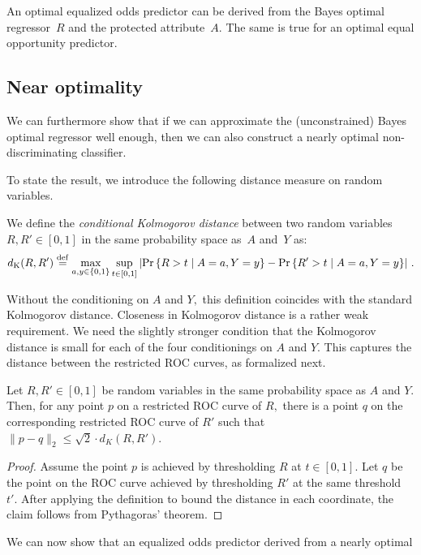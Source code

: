 \begin{corollary}
\label{cor:bayes-opt-fair}
An optimal equalized odds predictor can be derived from the Bayes
optimal regressor~$R$ and the protected attribute~$A.$ The same is true for
an optimal equal opportunity predictor.
\end{corollary}

\subsection{Near optimality}
%
We can furthermore show that if we can approximate the (unconstrained)
Bayes optimal regressor well enough, then we can also construct a
nearly optimal non-discriminating classifier.

To state the result, we introduce the following distance measure on random
variables.
\begin{definition}
We define the \emph{conditional Kolmogorov distance}
between two random variables $R,R'\in[0,1]$ in the same probability space
as~$A$ and~$Y$ as:
\begin{equation}
d_{\mathrm{K}}(R, R')\stackrel{\small \mathrm{def}}{=}
\max_{a,y\in\{0,1\}} \sup_{t\in[0,1]}
\left|\Pr\left\{R > t\mid A=a, Y=y\right\}
- \Pr\left\{R' > t\mid A=a, Y=y\right\}
\right|\,.
\end{equation}
\end{definition}
Without the conditioning on $A$ and $Y,$ this definition coincides with the
standard Kolmogorov distance. Closeness in Kolmogorov distance is a rather weak
requirement. We need the slightly stronger condition that the Kolmogorov
distance is small for each of the four conditionings on $A$ and $Y.$ This
captures the distance between the restricted ROC curves, as formalized next.
%
\begin{lemma}\label{lem:pythagoras}
Let $R, R'\in[0,1]$ be random variables in the same probability space as $A$ and
$Y.$ Then, for any point $p$ on a restricted ROC curve of $R,$ there is a point
$q$ on the corresponding restricted ROC curve of $R'$ such that
$\|p-q\|_2\le\sqrt{2}\cdot d_K(R, R').$
\end{lemma}
\begin{proof}
Assume the point $p$ is achieved by thresholding $R$ at $t\in[0,1].$ Let $q$ be
the point on the ROC curve achieved by thresholding $R'$ at the same threshold
$t'.$ After applying the definition to bound the distance in each coordinate,
the claim follows from Pythagoras' theorem.
\end{proof}
%
We can now show that an equalized odds predictor derived from a nearly optimal
